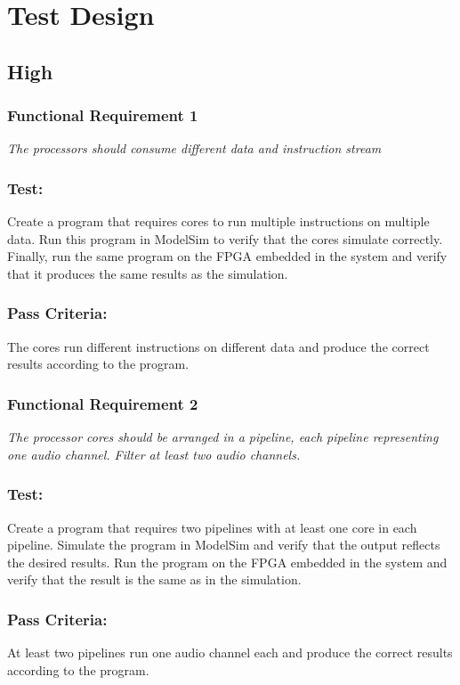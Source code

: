 \section{Test Design}

\subsection{High}

\subsubsection*{Functional Requirement 1}
\textit{The processors should consume different data and instruction stream}
\subsubsection*{Test:}
Create a program that requires cores to run multiple instructions on multiple data. 
Run this program in ModelSim to verify that the cores simulate correctly. 
Finally, run the same program on the FPGA embedded in the system and verify that it produces the same results as the simulation.
\subsubsection*{Pass Criteria:}
The cores run different instructions on different data and produce the correct results according to the program. 


\subsubsection*{Functional Requirement 2}
\textit{The processor cores should be arranged in a pipeline, each pipeline representing one audio channel. Filter at least two audio channels.}
\subsubsection*{Test:}
Create a program that requires two pipelines with at least one core in each pipeline. 
Simulate the program in ModelSim and verify that the output reflects the desired results.
Run the program on the FPGA embedded in the system and verify that the result is the same as in the simulation.
\subsubsection*{Pass Criteria:}
At least two pipelines run one audio channel each and produce the correct results according to the program.

